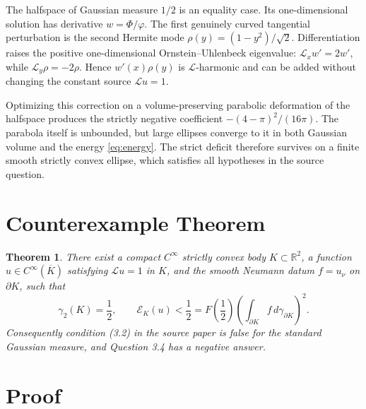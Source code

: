 \documentclass[11pt]{article}
\newtheorem{theorem}{Theorem}
\newcommand{\R}{\mathbb R}
\newcommand{\cL}{\mathcal L}
\begin{document}
The halfspace of Gaussian measure $1/2$ is an equality case.  Its one-dimensional
solution has derivative $w=\Phi/\varphi$.  The first genuinely curved
tangential perturbation is the second Hermite mode
$\rho(y)=(1-y^2)/\sqrt2$.  Differentiation raises the positive
one-dimensional Ornstein--Uhlenbeck eigenvalue: $\cL_x w'=2w'$, while
$\cL_y\rho=-2\rho$.  Hence $w'(x)\rho(y)$ is $\cL$-harmonic and can be added
without changing the constant source $\cL u=1$.

Optimizing this correction on a volume-preserving parabolic deformation of
the halfspace produces the strictly negative coefficient
$-(4-\pi)^2/(16\pi)$.  The parabola itself is unbounded, but large ellipses
converge to it in both Gaussian volume and the energy \eqref{eq:energy}.
The strict deficit therefore survives on a finite smooth strictly convex
ellipse, which satisfies all hypotheses in the source question.

\section*{Counterexample Theorem}

\begin{theorem}\label{thm:main}
There exist a compact $C^\infty$ strictly convex body $K\subset\R^2$, a
function $u\in C^\infty(\overline K)$ satisfying $\cL u=1$ in $K$, and the
smooth Neumann datum $f=u_\nu$ on $\partial K$, such that
\[
 \gamma_2(K)=\frac12,
 \qquad
 \mathcal E_K(u)<\frac12
 =F\!\left(\frac12\right)
   \left(\int_{\partial K}f\,d\gamma_{\partial K}\right)^2.
\]
Consequently condition (3.2) in the source paper is false for the standard
Gaussian measure, and Question 3.4 has a negative answer.
\end{theorem}

\section*{Proof}
\end{document}
